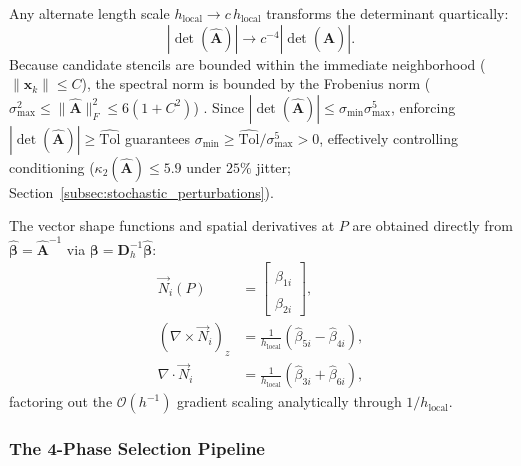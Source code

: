\documentclass[preprint,12pt]{elsarticle}
\begin{document}
Any alternate length scale $h_{\mathrm{local}} \to c \, h_{\mathrm{local}}$ transforms the determinant quartically:
\begin{equation}
    |\det(\widehat{\mathbf{A}})| \longrightarrow c^{-4} |\det(\widehat{\mathbf{A}})|.
    \label{eq:quartic_h_local_scaling}
\end{equation}
Because candidate stencils are bounded within the immediate neighborhood ($\|\hat{\mathbf{x}}_k\| \le C$), the spectral norm is bounded by the Frobenius norm ($\sigma_{\max}^2 \le \|\widehat{\mathbf{A}}\|_F^2 \le 6(1+C^2)$) \cite{golub2013matrix}. Since $|\det(\widehat{\mathbf{A}})| \le \sigma_{\min}\sigma_{\max}^5$, enforcing $|\det(\widehat{\mathbf{A}})| \ge \widehat{\mathrm{Tol}}$ guarantees $\sigma_{\min} \ge \widehat{\mathrm{Tol}}/\sigma_{\max}^5 > 0$, effectively controlling conditioning ($\kappa_2(\widehat{\mathbf{A}}) \le 5.9$ under $25\%$ jitter; Section~\ref{subsec:stochastic_perturbations}).

The vector shape functions and spatial derivatives at $P$ are obtained directly from $\widehat{\boldsymbol{\beta}} = \widehat{\mathbf{A}}^{-1}$ via $\boldsymbol{\beta} = \mathbf{D}_h^{-1} \widehat{\boldsymbol{\beta}}$:
\begin{align}
    \vec{N}_i(P)                & = \begin{bmatrix} \hat{\beta}_{1i} \\ \hat{\beta}_{2i} \end{bmatrix}, \label{eq:shape_func_hat_eval}        \\
    (\nabla \times \vec{N}_i)_z & = \frac{1}{h_{\mathrm{local}}} \left( \hat{\beta}_{5i} - \hat{\beta}_{4i} \right), \label{eq:curl_hat_eval} \\
    \nabla \cdot \vec{N}_i      & = \frac{1}{h_{\mathrm{local}}} \left( \hat{\beta}_{3i} + \hat{\beta}_{6i} \right), \label{eq:div_hat_eval}
\end{align}
factoring out the $\mathcal{O}(h^{-1})$ gradient scaling analytically through $1/h_{\mathrm{local}}$.

\subsubsection{The 4-Phase Selection Pipeline}
\label{subsec:4phase_pipeline}
\end{document}
